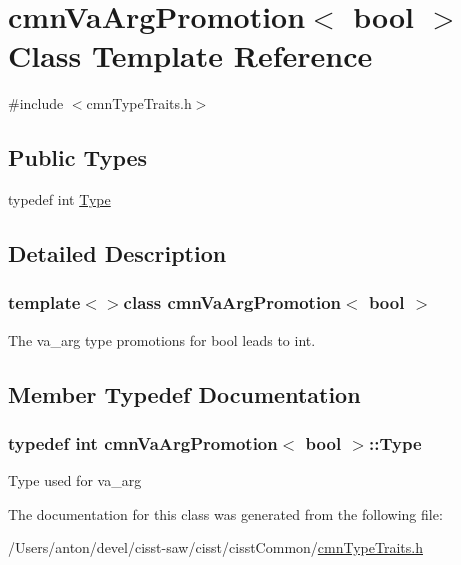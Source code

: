 \hypertarget{classcmn_va_arg_promotion_3_01bool_01_4}{}\section{cmn\+Va\+Arg\+Promotion$<$ bool $>$ Class Template Reference}
\label{classcmn_va_arg_promotion_3_01bool_01_4}


{\ttfamily \#include $<$cmn\+Type\+Traits.\+h$>$}

\subsection*{Public Types}
\begin{DoxyCompactItemize}
\item 
typedef int \hyperlink{classcmn_va_arg_promotion_3_01bool_01_4_a0fb2466f8edcf929f9cc7c5194a694b5}{Type}
\end{DoxyCompactItemize}


\subsection{Detailed Description}
\subsubsection*{template$<$$>$class cmn\+Va\+Arg\+Promotion$<$ bool $>$}

The va\+\_\+arg type promotions for bool leads to int. 

\subsection{Member Typedef Documentation}
\hypertarget{classcmn_va_arg_promotion_3_01bool_01_4_a0fb2466f8edcf929f9cc7c5194a694b5}{}
\subsubsection[{Type}]{\setlength{\rightskip}{0pt plus 5cm}typedef int {\bf cmn\+Va\+Arg\+Promotion}$<$ bool $>$\+::{\bf Type}}\label{classcmn_va_arg_promotion_3_01bool_01_4_a0fb2466f8edcf929f9cc7c5194a694b5}
Type used for va\+\_\+arg 

The documentation for this class was generated from the following file\+:\begin{DoxyCompactItemize}
\item 
/\+Users/anton/devel/cisst-\/saw/cisst/cisst\+Common/\hyperlink{cmn_type_traits_8h}{cmn\+Type\+Traits.\+h}\end{DoxyCompactItemize}
